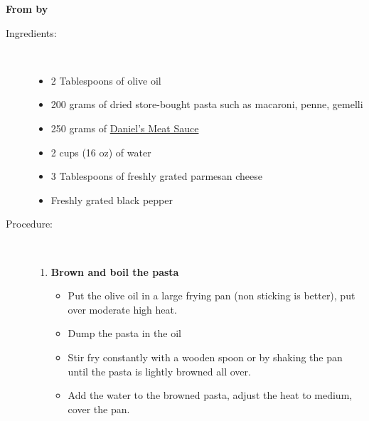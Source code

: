 \documentclass[11pt,letterpaper]{article}
\begin{document}


\begin{flushright}
{\bf From {\it } by }
\end{flushright}
 
\begin{description}

\item[Ingredients:]\ \\
	\begin{itemize}
	\item 2 Tablespoons of olive oil
	\item 200 grams of dried store-bought pasta such as macaroni, penne, gemelli
	\item 250 grams of \href{DanielsMeatSauce.html}{Daniel's Meat Sauce}
	\item 2 cups (16 oz) of water
	\item 3 Tablespoons of freshly grated parmesan cheese 
	\item Freshly grated black pepper
	\end{itemize}

\item[Procedure:]\ \\
	\begin{enumerate}
	\item {\bf Brown and boil the pasta}
	\begin{itemize}
	\item Put the olive oil in a large frying pan (non sticking is better), put over moderate high heat.
        \item Dump the pasta in the oil
	\item Stir fry constantly with a wooden spoon or by shaking the pan until the pasta is lightly browned all over.
	\item Add the water to the browned pasta, adjust the heat to medium, cover the pan.
	

\end{itemize}
\end{enumerate}
\end{description}
\end{document}
